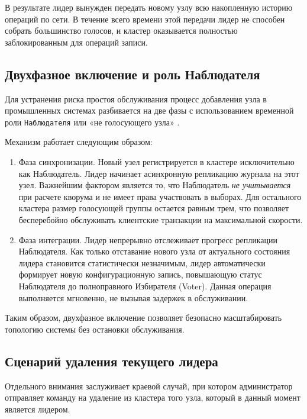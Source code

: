 В результате лидер вынужден передать новому узлу всю накопленную историю операций по сети. В течение всего времени этой передачи лидер не способен собрать большинство голосов, и кластер оказывается полностью заблокированным для операций записи.

\subsection{Двухфазное включение и роль Наблюдателя}

Для устранения риска простоя обслуживания процесс добавления узла в промышленных системах разбивается на две фазы с использованием временной роли \texttt{Наблюдателя} или «не голосующего узла» \cite{etcd_docs}.

Механизм работает следующим образом:
\begin{enumerate}
    \item Фаза синхронизации. Новый узел регистрируется в кластере исключительно как Наблюдатель. Лидер начинает асинхронную репликацию журнала на этот узел. Важнейшим фактором является то, что Наблюдатель \textit{не учитывается} при расчете кворума и не имеет права участвовать в выборах. Для остального кластера размер голосующей группы остается равным трем, что позволяет бесперебойно обслуживать клиентские транзакции на максимальной скорости.
    \item Фаза интеграции. Лидер непрерывно отслеживает прогресс репликации Наблюдателя. Как только отставание нового узла от актуального состояния лидера становится статистически незначимым, лидер автоматически формирует новую конфигурационную запись, повышающую статус Наблюдателя до полноправного Избирателя (Voter). Данная операция выполняется мгновенно, не вызывая задержек в обслуживании.
\end{enumerate}

Таким образом, двухфазное включение позволяет безопасно масштабировать топологию системы без остановки обслуживания.

\subsection{Сценарий удаления текущего лидера}

Отдельного внимания заслуживает краевой случай, при котором администратор отправляет команду на удаление из кластера того узла, который в данный момент является лидером.

